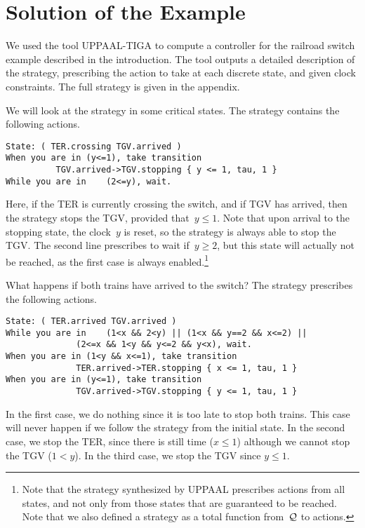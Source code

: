 \documentclass{article}
\begin{document}
\section{Solution of the Example}
We used the tool UPPAAL-TIGA to compute a controller for the railroad switch
example described in the introduction. The tool outputs a detailed description
of the strategy, prescribing the action to take at each discrete state, and
given clock constraints. The full strategy is given in the appendix. 

We will look at the strategy in some critical states. The strategy contains the
following actions.

{\scriptsize
\begin{verbatim}
State: ( TER.crossing TGV.arrived ) 
When you are in (y<=1), take transition 
          TGV.arrived->TGV.stopping { y <= 1, tau, 1 }
While you are in	(2<=y), wait.
\end{verbatim}
}

Here, if the TER is currently crossing the switch, and if TGV has arrived, then
the strategy stops the TGV, provided that~$y\leq 1$. Note that upon arrival to
the stopping state, the clock~$y$ is reset, so the strategy is always able to
stop the TGV. The second line prescribes to wait if~$y\geq 2$, but this state
will actually not be reached, as the first case is always enabled.\footnote{Note
that the strategy synthesized by UPPAAL prescribes actions from all states,
and not only from those states that are guaranteed to be reached. Note that
we also defined a strategy as a total function from~$\mathcal{Q}$ to actions.}

What happens if both trains have arrived to the switch? The strategy prescribes
the following actions.

{\scriptsize
\begin{verbatim}
State: ( TER.arrived TGV.arrived ) 
While you are in	(1<x && 2<y) || (1<x && y==2 && x<=2) || 
              (2<=x && 1<y && y<=2 && y<x), wait.
When you are in (1<y && x<=1), take transition 
              TER.arrived->TER.stopping { x <= 1, tau, 1 }
When you are in (y<=1), take transition 
              TGV.arrived->TGV.stopping { y <= 1, tau, 1 }
\end{verbatim}
}

In the first case, we do nothing since it is too late to stop both trains. This
case will never happen if we follow the strategy from the initial state.
In the second case, we stop the TER, since there is still time ($x\leq 1$)
although we cannot stop the TGV ($1<y$). In the third case, we stop the TGV
since $y\leq 1$.
\end{document}
